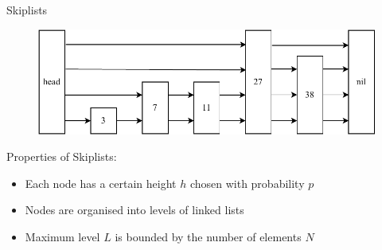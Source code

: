 \begin{frame}{Skiplists}
    

\begin{figure}
    \centering
    \includegraphics[height=0.35\textheight]{images/skiplist.pdf}
\end{figure}


Properties of Skiplists:
\begin{itemize}
    \item Each node has a certain height $h$ chosen with probability $p$
    \item Nodes are organised into levels of linked lists
    \item Maximum level $L$ is bounded by the number of elements $N$
\end{itemize}

\end{frame}